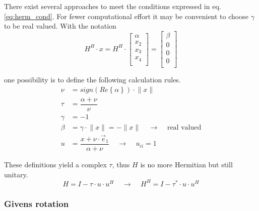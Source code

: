 There exist several approaches to meet the conditions expressed in
eq. \eqref{eq:herm_cond}.  For fewer computational effort it may be
convenient to choose $\gamma$ to be real valued.  With the notation
\begin{equation}
H^H\cdot x =
H^H\cdot
\begin{bmatrix}
\alpha\\
x_2\\
x_3\\
x_4\\
\end{bmatrix}
=
\begin{bmatrix}
\beta\\
0\\
0\\
0\\
\end{bmatrix}
\end{equation}

one possibility is to define the following calculation rules.
\begin{align}
\nu &= sign\left(Re\left\{\alpha\right\}\right)\cdot \lVert x \rVert\\
\tau &= \dfrac{\alpha + \nu}{\nu}\\
\gamma &= -1\\
\beta &= \gamma \cdot \lVert x \rVert = - \lVert x \rVert
\;\;\;\; \rightarrow \;\;\;\;
\textrm{real valued}\\
u &= \dfrac{x + \nu\cdot \vec{e}_1}{\alpha + \nu}
\;\;\;\; \rightarrow \;\;\;\;
u_{ii} = 1
\end{align}

These definitions yield a complex $\tau$, thus $H$ is no more
Hermitian but still unitary.
\begin{equation}
H = I - \tau\cdot u\cdot u^H
\;\;\;\; \rightarrow \;\;\;\;
H^H = I - \tau^*\cdot u\cdot u^H
\end{equation}

\subsubsection{Givens rotation}

